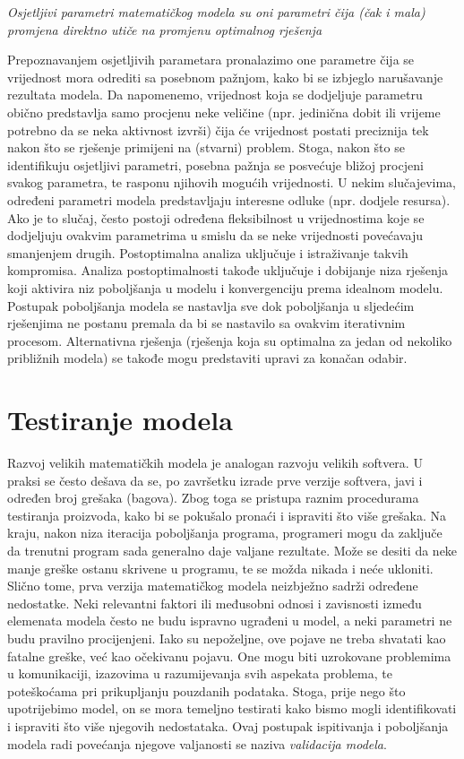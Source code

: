 \documentclass[a4paper, utf8, 11pt, colorlinks]{book}
\theoremstyle{definition}
\begin{document}
\emph{Osjetljivi parametri matematičkog modela su oni parametri čija (čak i mala) promjena direktno utiče na promjenu optimalnog rješenja}

Prepoznavanjem osjetljivih parametara pronalazimo one parametre čija se vrijednost mora odrediti sa posebnom pažnjom, kako bi se izbjeglo narušavanje rezultata modela. Da napomenemo, vrijednost koja se dodjeljuje parametru obično predstavlja samo procjenu neke veličine
(npr. jedinična dobit ili vrijeme potrebno da se neka aktivnost izvrši) čija će vrijednost postati preciznija tek nakon što se rješenje primijeni na (stvarni) problem. Stoga, nakon
što se identifikuju osjetljivi parametri, posebna pažnja se posvećuje bližoj procjeni svakog parametra, te  rasponu njihovih mogućih vrijednosti.  U nekim slučajevima, određeni parametri modela predstavljaju interesne odluke (npr. dodjele resursa). Ako je to slučaj, često postoji određena fleksibilnost u vrijednostima koje se dodjeljuju ovakvim parametrima u smislu da se neke vrijednosti povećavaju smanjenjem drugih. Postoptimalna analiza uključuje i istraživanje takvih kompromisa. Analiza postoptimalnosti takođe uključuje i dobijanje niza rješenja koji aktivira niz poboljšanja u modelu i konvergenciju prema idealnom modelu. Postupak poboljšanja modela se nastavlja sve dok    poboljšanja u sljedećim rješenjima ne postanu premala da bi se nastavilo sa ovakvim iterativnim procesom.   Alternativna rješenja (rješenja koja su optimalna za jedan od nekoliko približnih modela) se takođe mogu predstaviti upravi za konačan odabir. 



\section{Testiranje modela}
Razvoj velikih matematičkih modela je analogan razvoju velikih softvera. U praksi se često dešava da se, po završetku izrade prve verzije softvera, javi i određen broj grešaka (bagova). Zbog toga se pristupa raznim procedurama testiranja proizvoda, kako bi se pokušalo pronaći i
ispraviti što više grešaka. Na kraju, nakon niza iteracija poboljšanja programa, programeri mogu da zaključe da trenutni program sada generalno
daje  valjane rezultate. Može se desiti da neke manje greške ostanu skrivene u programu, te se možda   nikada i neće ukloniti. Slično tome, prva verzija matematičkog modela neizbježno sadrži određene
nedostatke. Neki relevantni faktori ili međusobni odnosi i zavisnosti između elemenata modela često ne budu  ispravno ugrađeni
u model, a neki parametri ne budu pravilno procijenjeni. Iako su nepoželjne, ove pojave ne treba shvatati kao fatalne greške, već kao očekivanu pojavu. One mogu biti uzrokovane problemima u komunikaciji, izazovima u razumijevanja svih aspekata problema, te poteškoćama pri prikupljanju pouzdanih podataka. Stoga, prije nego što upotrijebimo model, on se mora  temeljno testirati kako bismo mogli  identifikovati 
i ispraviti što više njegovih nedostataka.  Ovaj postupak ispitivanja i poboljšanja modela radi povećanja njegove valjanosti se naziva \emph{validacija modela}. 
\end{document}
